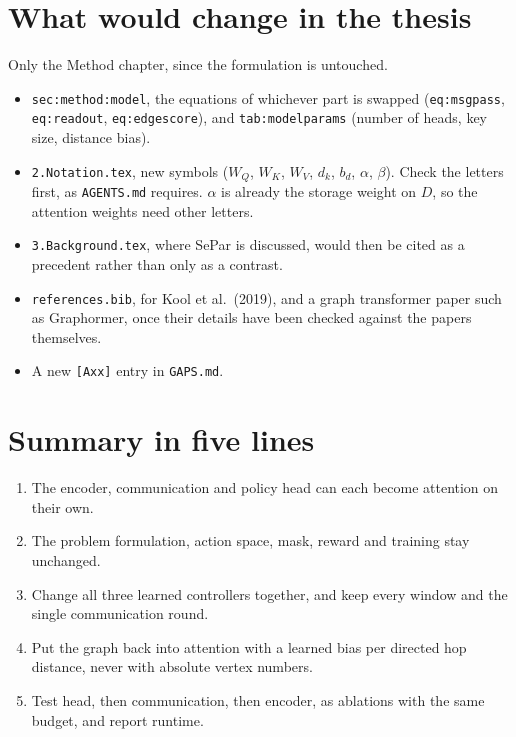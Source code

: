 \documentclass[11pt,a4paper]{article}
\begin{document}
\section{What would change in the thesis}

Only the Method chapter, since the formulation is untouched.
\begin{itemize}[leftmargin=*]
  \item \texttt{sec:method:model}, the equations of whichever part is
        swapped (\texttt{eq:msgpass}, \texttt{eq:readout}, \texttt{eq:edgescore}),
        and \texttt{tab:modelparams} (number of heads, key size, distance
        bias).
  \item \texttt{2.Notation.tex}, new symbols ($W_Q$, $W_K$, $W_V$, $d_k$,
        $b_d$, $\alpha$, $\beta$). Check the letters first, as
        \texttt{AGENTS.md} requires. $\alpha$ is already the storage weight
        on $D$, so the attention weights need other letters.
  \item \texttt{3.Background.tex}, where SePar is discussed, would then be
        cited as a precedent rather than only as a contrast.
  \item \texttt{references.bib}, for Kool et al.\ (2019), and a graph
        transformer paper such as Graphormer, once their details have been
        checked against the papers themselves.
  \item A new \texttt{[Axx]} entry in \texttt{GAPS.md}.
\end{itemize}

\section{Summary in five lines}

\begin{enumerate}[leftmargin=*]
  \item The encoder, communication and policy head can each become attention on their own.
  \item The problem formulation, action space, mask, reward and training stay unchanged.
  \item Change all three learned controllers together, and keep every window and the single communication round.
  \item Put the graph back into attention with a learned bias per directed hop distance, never with absolute vertex numbers.
  \item Test head, then communication, then encoder, as ablations with the same budget, and report runtime.
\end{enumerate}
\end{document}

